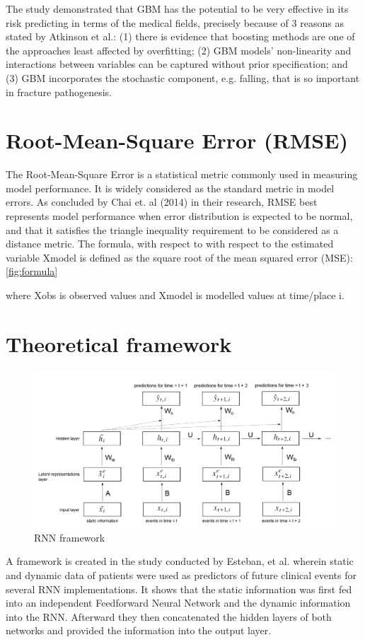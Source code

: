 \documentclass[10pt,11pt,12pt,oneside]{book}
\begin{document}
        The study demonstrated that GBM has the potential to be very effective in its risk predicting in terms of the medical fields, precisely because of 3 reasons as stated by Atkinson et al.: (1) there is evidence that boosting methods are one of the approaches least affected by overfitting; (2) GBM models’ non-linearity and interactions between variables can be captured without prior specification; and (3) GBM incorporates the stochastic component, e.g. falling, that is so important in fracture pathogenesis. \cite{Atkinson2012}
    \section{Root-Mean-Square Error (RMSE)}
    The Root-Mean-Square Error is a statistical metric commonly used in measuring model performance. It is widely considered as the standard metric in model errors. As concluded by Chai et. al (2014) in their research, RMSE best represents model performance when error distribution is expected to be normal, and that it satisfies the triangle inequality requirement to be considered as a distance metric. The formula, with respect to with respect to the estimated variable Xmodel is defined as the square root of the mean squared error (MSE): 
                           \ref{fig:formula}

    where Xobs is observed values and Xmodel is modelled values at time/place i.

   \pagebreak
    \section{Theoretical framework}
    \begin{figure} [ht]
        \includegraphics[width=6.5in]{rnnframework.png}
        \caption{RNN framework}
        \medskip
    \end{figure}
    A framework is created in the study conducted by Esteban, et al. wherein static and dynamic data of patients were used as predictors of future clinical events for several RNN implementations. It shows that the static information was first fed into an independent Feedforward Neural Network and the dynamic information into the RNN. Afterward they then concatenated the hidden layers of both networks and provided the information into the output layer.
    
\end{document}
